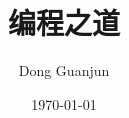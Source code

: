 \documentclass[9pt]{beamer}
\begin{document}
\title{编程之道}
\author{Dong Guanjun}
\date{\today}

\begin{frame}
\titlepage
\end{frame}



\newpage
\end{document}
